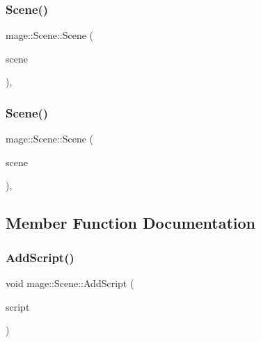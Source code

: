 \hypertarget{classmage_1_1_scene_a88d83ccb2e10549d5370f850b2b4c228}{}\label{classmage_1_1_scene_a88d83ccb2e10549d5370f850b2b4c228} 
\subsubsection{\texorpdfstring{Scene()}{Scene()}\hspace{0.1cm}{\footnotesize\ttfamily [2/3]}}
{\footnotesize\ttfamily mage\+::\+Scene\+::\+Scene (\begin{DoxyParamCaption}\item[{const \hyperlink{classmage_1_1_scene}{Scene} \&}]{scene }\end{DoxyParamCaption})\hspace{0.3cm}{\ttfamily [protected]}, {\ttfamily [delete]}}

\hypertarget{classmage_1_1_scene_a35b8fc4242c2348e53014b96416fc3d3}{}\label{classmage_1_1_scene_a35b8fc4242c2348e53014b96416fc3d3} 
\subsubsection{\texorpdfstring{Scene()}{Scene()}\hspace{0.1cm}{\footnotesize\ttfamily [3/3]}}
{\footnotesize\ttfamily mage\+::\+Scene\+::\+Scene (\begin{DoxyParamCaption}\item[{\hyperlink{classmage_1_1_scene}{Scene} \&\&}]{scene }\end{DoxyParamCaption})\hspace{0.3cm}{\ttfamily [protected]}, {\ttfamily [default]}}



\subsection{Member Function Documentation}
\hypertarget{classmage_1_1_scene_ab97b66c81c32681699052e154d0e0722}{}\label{classmage_1_1_scene_ab97b66c81c32681699052e154d0e0722} 
\subsubsection{\texorpdfstring{Add\+Script()}{AddScript()}}
{\footnotesize\ttfamily void mage\+::\+Scene\+::\+Add\+Script (\begin{DoxyParamCaption}\item[{\hyperlink{namespacemage_a1e01ae66713838a7a67d30e44c67703e}{Shared\+Ptr}$<$ \hyperlink{classmage_1_1_behavior_script}{Behavior\+Script} $>$}]{script }\end{DoxyParamCaption})}

